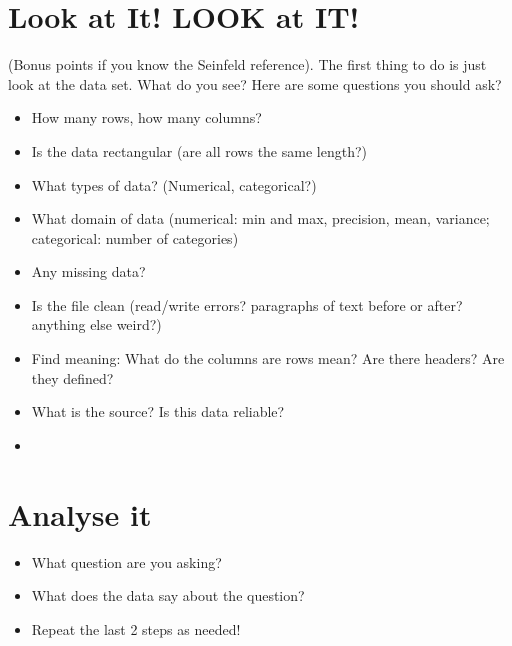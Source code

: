 \documentclass[letterpaper,10pt,english]{jupyterBook}
\begin{document}
\section{Look at It! LOOK at IT!}
\label{\detokenize{lessons/hw02:look-at-it-look-at-it}}
\sphinxAtStartPar
(Bonus points if you know the Seinfeld reference). The first thing to do is just look at the data set. What do you see? Here are some questions you should ask?
\begin{itemize}
\item {} 
\sphinxAtStartPar
How many rows, how many columns?

\item {} 
\sphinxAtStartPar
Is the data rectangular (are all rows the same length?)

\item {} 
\sphinxAtStartPar
What types of data? (Numerical, categorical?)

\item {} 
\sphinxAtStartPar
What domain of data (numerical: min and max, precision, mean, variance; categorical: number of categories)

\item {} 
\sphinxAtStartPar
Any missing data?

\item {} 
\sphinxAtStartPar
Is the file clean (read/write errors? paragraphs of text before or after? anything else weird?)

\item {} 
\sphinxAtStartPar
Find meaning: What do the columns are rows mean? Are there headers? Are they defined?

\item {} 
\sphinxAtStartPar
What is the source? Is this data reliable?

\item {} 
\sphinxAtStartPar
{}

\end{itemize}


\section{Analyse it}
\label{\detokenize{lessons/hw02:analyse-it}}\begin{itemize}
\item {} 
\sphinxAtStartPar
What question are you asking?

\item {} 
\sphinxAtStartPar
What does the data say about the question?

\item {} 
\sphinxAtStartPar
Repeat the last 2 steps as needed!

\end{itemize}
\end{document}
